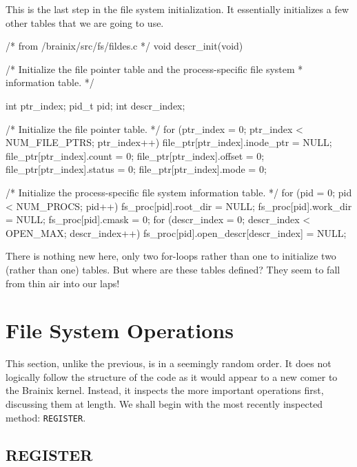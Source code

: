 This is the last step in the file system initialization. It essentially initializes a few other tables that we are going to use.
\begin{code}[numbers=left,firstnumber=32]
/* from /brainix/src/fs/fildes.c */
 void descr_init(void)
 {
 
 /* Initialize the file pointer table and the process-specific file system
  * information table. */
 
      int ptr_index;
      pid_t pid;
      int descr_index;
 
      /* Initialize the file pointer table. */
      for (ptr_index = 0; ptr_index < NUM_FILE_PTRS; ptr_index++)
      {
           file_ptr[ptr_index].inode_ptr = NULL;
           file_ptr[ptr_index].count = 0;
           file_ptr[ptr_index].offset = 0;
           file_ptr[ptr_index].status = 0;
           file_ptr[ptr_index].mode = 0;
      }
 
      /* Initialize the process-specific file system information table. */
      for (pid = 0; pid < NUM_PROCS; pid++)
      {
           fs_proc[pid].root_dir = NULL;
           fs_proc[pid].work_dir = NULL;
           fs_proc[pid].cmask = 0;
           for (descr_index = 0; descr_index < OPEN_MAX; descr_index++)
                fs_proc[pid].open_descr[descr_index] = NULL;
      }
 }
\end{code}
There is nothing new here, only two for-loops rather than one to initialize two (rather than one) tables. But where are these tables defined? They seem to fall from thin air into our laps!


 

\section{File System Operations}

This section, unlike the previous, is in a seemingly random order. It does not logically follow the structure of the code as it would appear to a new comer to the Brainix kernel. Instead, it inspects the more important operations first, discussing them at length. We shall begin with the most recently inspected method: \verb|REGISTER|.

\subsection{REGISTER}

